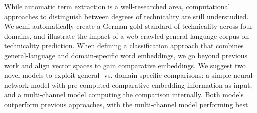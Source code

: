 While automatic term extraction is a well-researched area, computational approaches to distinguish between degrees of technicality are still understudied. We semi-automatically create a German gold standard of technicality across four domains, and illustrate the impact of a web-crawled general-language corpus on technicality prediction. When defining a classification approach that combines general-language and domain-specific word embeddings, we go beyond previous work and align vector spaces to gain comparative embeddings. We suggest two novel models to exploit general- vs. domain-specific comparisons: a simple neural network model with pre-computed comparative-embedding information as input, and a multi-channel model computing the comparison internally. Both models outperform previous approaches, with the multi-channel model performing best.
